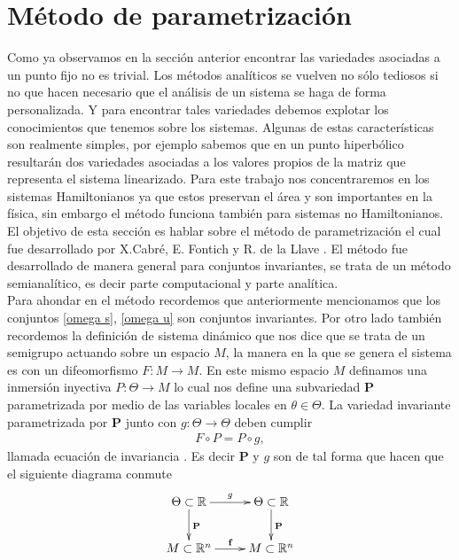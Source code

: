 \section{Método de parametrización}
Como ya observamos en la sección anterior encontrar las variedades asociadas a un punto fijo no es trivial. Los métodos analíticos se vuelven no sólo tediosos si no que hacen necesario que el análisis de un sistema se haga de forma personalizada. Y para encontrar tales variedades debemos explotar los conocimientos que tenemos sobre los sistemas. Algunas de estas características son realmente simples, por ejemplo sabemos que en un punto hiperbólico resultarán dos variedades asociadas a los valores propios de la matriz que representa el sistema linearizado. Para este trabajo nos concentraremos en los sistemas Hamiltonianos ya que estos preservan el área y son importantes en la física, sin embargo el método funciona también para sistemas no Hamiltonianos. El objetivo de esta sección es hablar sobre el método de parametrización el cual fue desarrollado por X.Cabré, E. Fontich y R. de la Llave \cite{Haro}. El método fue desarrollado de manera general para conjuntos invariantes, se trata de un método semianalítico, es decir parte computacional y parte analítica.\\

Para ahondar en el método recordemos que anteriormente mencionamos que los conjuntos \ref{omega s}, \ref{omega u} son conjuntos invariantes. Por otro lado también recordemos la definición de sistema dinámico que nos dice que se trata de un semigrupo actuando sobre un espacio $M$, la manera en la que se genera el sistema es con un difeomorfismo $F:M \rightarrow M$. En este mismo espacio $M$ definamos una inmersión inyectiva $P:\Theta \rightarrow M$  lo cual nos define una subvariedad $\textbf{P}$  parametrizada por medio de las variables locales en $\theta \in \Theta$. La variedad invariante parametrizada por $\textbf{P}$  junto con $g:\Theta \rightarrow \Theta$ deben cumplir 
\begin{eqnarray}
F \circ P = P \circ g,  \label{Ecua de invariancia}
\end{eqnarray}
llamada ecuación de invariancia \cite{Haro}.
Es decir $\textbf{P}$ y $g$ son de tal forma que hacen que el siguiente diagrama conmute
\begin{eqnarray}
\xymatrix{
\Theta\subset\mathbb{R} \ar[d]^{\textbf{P}} \ar[r]^{g} & \Theta\subset\mathbb{R} \ar[d]^{\textbf{P}} \\
M\subset\mathbb{R}^{n} \ar[r]^{\textbf{f}} & M\subset\mathbb{R}^{n}
}\label{conmutativo}
\end{eqnarray}

